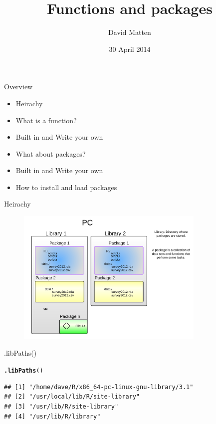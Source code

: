 \documentclass{beamer}\usepackage[]{graphicx}\usepackage[]{color}
\makeatletter
\newcommand{\hlstd}[1]{\textcolor[rgb]{0.345,0.345,0.345}{#1}}%
\newcommand{\hlkwd}[1]{\textcolor[rgb]{0.737,0.353,0.396}{\textbf{#1}}}%
\newenvironment{kframe}{%
 \def\at@end@of@kframe{}%
 \ifinner\ifhmode%
  \def\at@end@of@kframe{\end{minipage}}%
  \begin{minipage}{\columnwidth}%
 \fi\fi%
 \def\FrameCommand##1{\hskip\@totalleftmargin \hskip-\fboxsep
 \colorbox{shadecolor}{##1}\hskip-\fboxsep
     \hskip-\linewidth \hskip-\@totalleftmargin \hskip\columnwidth}%
 \MakeFramed {\advance\hsize-\width
   \@totalleftmargin\z@ \linewidth\hsize
   \@setminipage}}%
 {\par\unskip\endMakeFramed%
 \at@end@of@kframe}
\newenvironment{knitrout}{}{} %
\makeatother
\begin{document}
\title{Functions and packages}
\author{David Matten}
\date{30 April 2014}

\maketitle

\begin{frame}[fragile]{Overview}




\begin{itemize}

\item Heirachy
\item What is a function?
\item Built in and Write your own
\item What about packages?
\item Built in and Write your own
\item How to install and load packages
\end{itemize}

\end{frame}


\begin{frame}[fragile]{Heirachy}

\begin{figure}[ht!]
\centering
\includegraphics[width=90mm]{pictures/heirachy.jpg}
\label{overflow}
\end{figure}

\end{frame}


\begin{frame}[fragile]{.libPaths()}
\begin{knitrout}
\color{fgcolor}\begin{kframe}
\begin{alltt}
\hlkwd{.libPaths}\hlstd{()}
\end{alltt}
\begin{verbatim}
## [1] "/home/dave/R/x86_64-pc-linux-gnu-library/3.1"
## [2] "/usr/local/lib/R/site-library"               
## [3] "/usr/lib/R/site-library"                     
## [4] "/usr/lib/R/library"
\end{verbatim}
\end{kframe}
\end{knitrout}

\end{frame}
\end{document}
